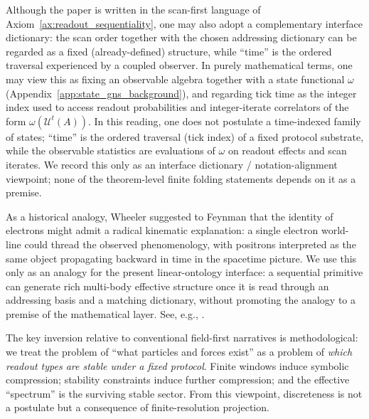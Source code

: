 \begin{remark}\label{rem:static_ontology}
Although the paper is written in the scan-first language of Axiom~\ref{ax:readout_sequentiality}, one may also adopt a complementary interface dictionary: the scan order together with the chosen addressing dictionary can be regarded as a fixed (already-defined) structure, while ``time'' is the ordered traversal experienced by a coupled observer.
In purely mathematical terms, one may view this as fixing an observable algebra together with a state functional $\omega$ (Appendix~\ref{app:state_gns_background}), and regarding tick time as the integer index used to access readout probabilities and integer-iterate correlators of the form $\omega(\mathcal{U}^t(A))$.
In this reading, one does not postulate a time-indexed family of states; ``time'' is the ordered traversal (tick index) of a fixed protocol substrate, while the observable statistics are evaluations of $\omega$ on readout effects and scan iterates.
We record this only as an interface dictionary / notation-alignment viewpoint; none of the theorem-level finite folding statements depends on it as a premise.
\end{remark}

\begin{remark}\label{rem:wheeler_one_electron}
As a historical analogy, Wheeler suggested to Feynman that the identity of electrons might admit a radical kinematic explanation: a single electron world-line could thread the observed phenomenology, with positrons interpreted as the same object propagating backward in time in the spacetime picture.
We use this only as an analogy for the present linear-ontology interface: a sequential primitive can generate rich multi-body effective structure once it is read through an addressing basis and a matching dictionary, without promoting the analogy to a premise of the mathematical layer.
See, e.g., \cite{Feynman1949TheoryPositrons,Feynman1965NobelLecture}.
\end{remark}

The key inversion relative to conventional field-first narratives is methodological:
we treat the problem of ``what particles and forces exist'' as a problem of \emph{which readout types are stable under a fixed protocol}.
Finite windows induce symbolic compression; stability constraints induce further compression; and the effective ``spectrum'' is the surviving stable sector.
From this viewpoint, discreteness is not a postulate but a consequence of finite-resolution projection.

